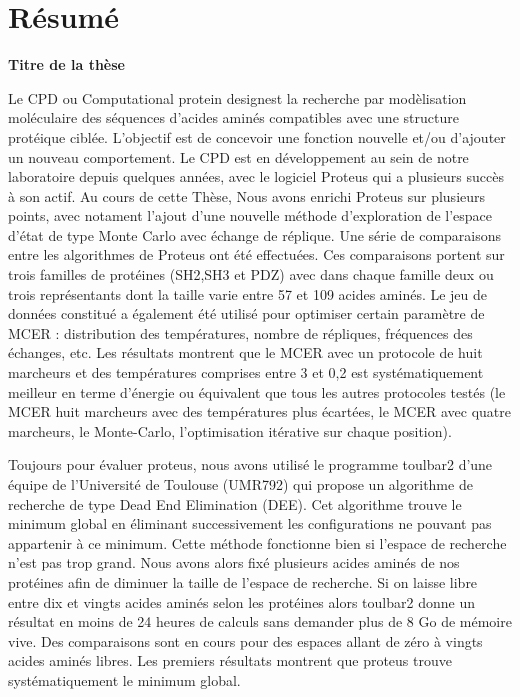 

\section*{Résumé}

{\large\bf\noindent Titre de la thèse}

\bigskip

Le CPD ou \og Computational protein design\fg est la recherche par modèlisation moléculaire des séquences d'acides aminés compatibles avec une structure protéique ciblée.
L'objectif est de concevoir une fonction nouvelle et/ou d'ajouter un nouveau comportement.
Le CPD est en développement au sein de notre laboratoire depuis quelques années, avec le logiciel Proteus qui a plusieurs succès à son actif.
Au cours de cette Thèse, Nous avons enrichi Proteus sur plusieurs points, avec notament l'ajout d'une nouvelle méthode d'exploration de l'espace d'état de type Monte Carlo avec échange de réplique. Une série de comparaisons entre les algorithmes de Proteus ont été effectuées. Ces comparaisons portent sur trois familles de protéines (SH2,SH3 et PDZ) avec dans chaque famille deux ou trois représentants dont la taille varie entre 57 et 109 acides aminés. Le jeu de données constitué a également été utilisé pour optimiser certain paramètre de MCER : distribution des températures, nombre de répliques, fréquences des échanges, etc. Les résultats montrent que le MCER avec un protocole de huit marcheurs et des températures comprises entre 3 et 0,2 est systématiquement meilleur en terme d'énergie ou équivalent que tous les autres protocoles testés (le MCER huit marcheurs avec des températures plus écartées, le MCER avec quatre marcheurs, le Monte-Carlo, l'optimisation itérative sur chaque position). 

  Toujours pour évaluer proteus, nous avons utilisé le programme toulbar2 d'une équipe de l'Université de Toulouse (UMR792) qui propose un algorithme de recherche de type Dead End Elimination (DEE). Cet algorithme trouve le minimum global en éliminant successivement les configurations ne pouvant pas appartenir à ce minimum. Cette méthode fonctionne bien si l'espace de recherche  n'est pas trop grand. Nous avons alors fixé plusieurs acides aminés de nos protéines afin de diminuer la taille de l'espace de recherche. Si on laisse libre entre dix et vingts acides aminés selon les protéines alors toulbar2 donne un résultat en moins de 24 heures de calculs sans demander plus de 8 Go de mémoire vive. Des comparaisons sont en cours pour des espaces allant de zéro à vingts acides aminés libres. Les premiers résultats montrent que proteus trouve systématiquement le minimum global. 

